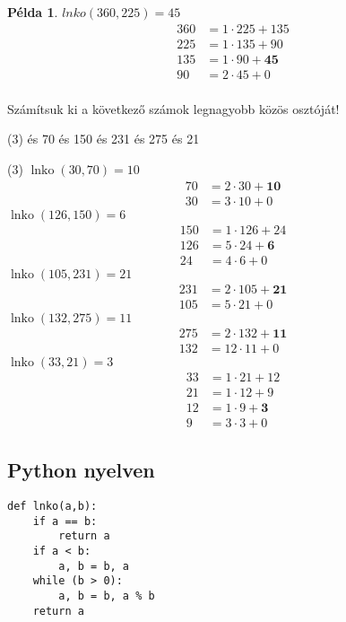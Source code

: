 \documentclass[a4paper,12pt]{article}
\DeclareMathOperator{\lnko}{lnko}
\theoremstyle{definition}
\newtheorem*{example}{Példa}
\begin{document}
	\begin{example} $ lnko(360,225) = 45 $
		\begin{align*}
		360&=1 \cdot 225+135\\
		225&=1 \cdot 135+90\\
		135&=1 \cdot 90+\mathbf{45}\\
		90&=2 \cdot 45+0\\
		\end{align*}
	\newpage
		\begin{question}
Számítsuk ki a következő számok legnagyobb közös osztóját!
			\begin{tasks}(3)
				 és 70
				 és 150
				 és 231
				 és 275
				 és 21
			\end{tasks}
		\end{question}
		\begin{solution}
			\begin{tasks}(3)
				\task $\lnko{(30,70)} = 10 $ \begin{align*}
					70&=2 \cdot 30+\mathbf{10}\\
					30&=3 \cdot 10+0
				\end{align*}
				\task $\lnko{(126,150)} = 6 $ \begin{align*}
					150&=1 \cdot 126+24\\
					126&=5 \cdot 24+\mathbf{6}\\
					24&=4 \cdot 6 + 0
				\end{align*}
				\task $\lnko{(105,231)} = 21 $ \begin{align*}
					231&=2 \cdot 105+\mathbf{21}\\
					105&=5 \cdot 21+0
				\end{align*}
					\task $\lnko{(132,275)} = 11 $ \begin{align*}
					275&=2 \cdot 132+\mathbf{11}\\
					132&=12 \cdot 11+0
				\end{align*}
				\task $\lnko{(33,21)} = 3 $ \begin{align*}
					33&=1 \cdot 21+12\\
					21&=1 \cdot 12 + 9\\
					12&=1 \cdot 9 + \mathbf{3}\\
					9&=3 \cdot 3 + 0
				\end{align*}
			\end{tasks}
		\end{solution}
	\end{example}
	\subsection{Python nyelven}
	\begin{verbatim}
def lnko(a,b):
	if a == b:
		return a
	if a < b:
		a, b = b, a
	while (b > 0):
		a, b = b, a % b
	return a
	\end{verbatim}
\newpage
\end{document}
